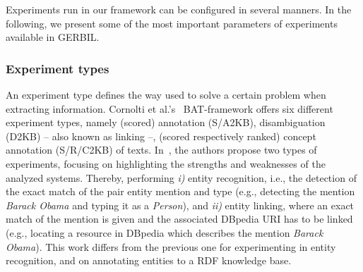 Experiments run in our framework can be configured in several manners. In the following, we present some of the most important parameters of experiments available in GERBIL. 

\subsubsection{Experiment types}
An experiment type defines the way used to solve a certain problem when extracting information.
Cornolti et al.'s~\cite{cornolti} BAT-framework offers six different experiment types, namely (scored) annotation (S/A2KB), disambiguation (D2KB) -- also known as linking --, (scored respectively ranked) concept annotation (S/R/C2KB) of texts. 
In~\cite{rizzo2014}, the authors propose two types of experiments, focusing on highlighting the strengths and weaknesses of the analyzed systems.
Thereby, performing \textit{i)} entity recognition, i.e., the detection of the exact match of the pair entity mention and type (e.g., detecting the mention \textit{Barack Obama} and typing it as a \textit{Person}), and \textit{ii)} entity linking, where an exact match of the mention is given and the associated DBpedia URI has to be linked (e.g., locating a resource in DBpedia which describes the mention \textit{Barack Obama}).
This work differs from the previous one for experimenting in entity recognition, and on annotating entities to a RDF knowledge base.



